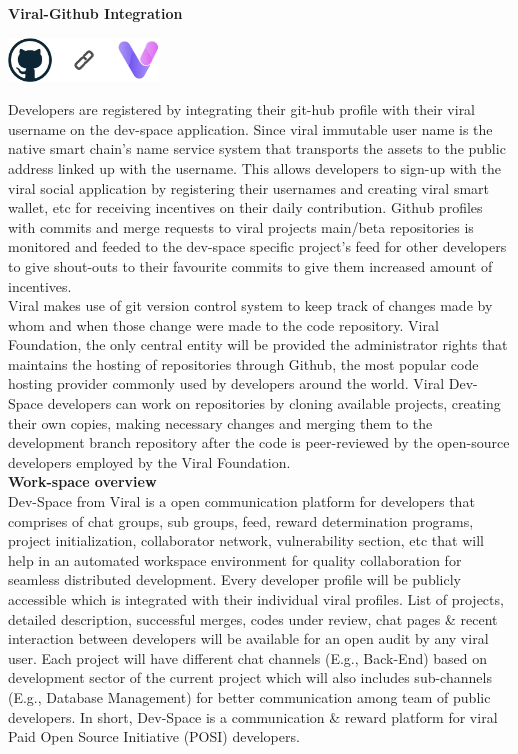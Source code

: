 \documentclass[conference]{IEEEtran}
\begin{document}
\textbf{Viral-Github Integration}\\

\begin{center}
\includegraphics[width=4cm]{git-int}
\end{center}

Developers are registered by integrating their git-hub profile with their viral username on the dev-space application. Since viral immutable user name is the native smart chain's name service system that transports the assets to the public address linked up with the username. This allows developers to sign-up with the viral social application by registering their usernames and creating viral smart wallet, etc for receiving incentives on their daily contribution. Github profiles with commits and merge requests to viral projects main/beta repositories is monitored and feeded to the dev-space specific project's feed for other developers to give shout-outs to their favourite commits to give them increased amount of incentives.\\

Viral makes use of git version control system to keep track of changes made by whom and when those change were made to the code repository. Viral Foundation, the only central entity will be provided the administrator rights that maintains the hosting of repositories through Github, the most popular code hosting provider commonly used by developers around the world. Viral Dev-Space developers can work on repositories by cloning available projects, creating their own copies, making necessary changes and merging them to the development branch repository after the code is peer-reviewed by the open-source developers employed by the Viral Foundation.\\ 

\textbf{Work-space overview}\\

Dev-Space from Viral is a open communication platform for developers that comprises of chat groups, sub groups, feed, reward determination programs, project initialization, collaborator network, vulnerability section, etc that will help in an automated workspace environment for quality collaboration for seamless distributed development. Every developer profile will be publicly accessible which is integrated with their individual viral profiles. List of projects, detailed description, successful merges, codes under review, chat pages \& recent interaction between developers will be available for an open audit by any viral user. Each project will have different chat channels (E.g., Back-End) based on development sector of the current project which will also includes sub-channels (E.g., Database Management) for better communication among team of public developers. In short, Dev-Space is a communication \& reward platform for viral Paid Open Source Initiative (POSI) developers.\\
\end{document}
